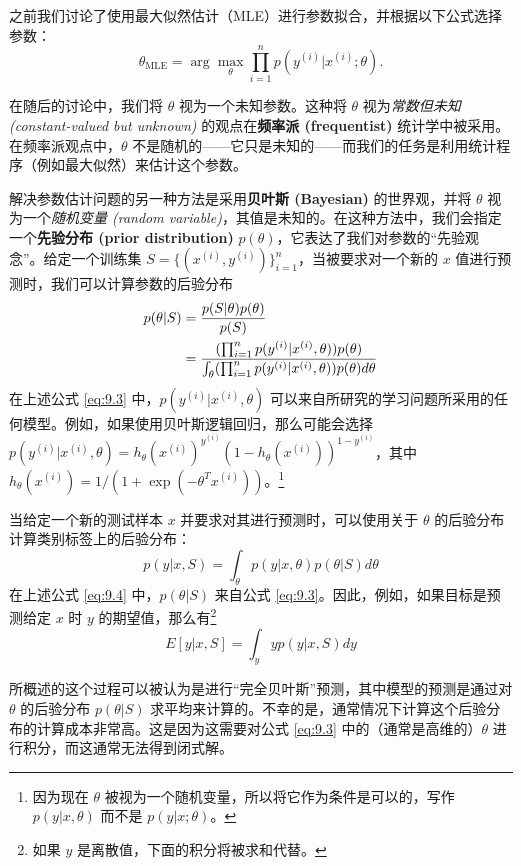 之前我们讨论了使用最大似然估计（MLE）进行参数拟合，并根据以下公式选择参数：
\[
    \theta_{\text{MLE}} = \arg \max_\theta \prod_{i=1}^n p(y^{(i)} | x^{(i)}; \theta).
\]

在随后的讨论中，我们将 $\theta$ 视为一个未知参数。这种将 $\theta$ 视为\textit{常数但未知 (constant-valued but unknown)} 的观点在\textbf{频率派 (frequentist)} 统计学中被采用。在频率派观点中，$\theta$ 不是随机的——它只是未知的——而我们的任务是利用统计程序（例如最大似然）来估计这个参数。

解决参数估计问题的另一种方法是采用\textbf{贝叶斯 (Bayesian)} 的世界观，并将 $\theta$ 视为一个\textit{随机变量 (random
variable)}，其值是未知的。在这种方法中，我们会指定一个\textbf{先验分布 (prior distribution)} $p(\theta)$，它表达了我们对参数的“先验观念”。给定一个训练集 $S = \{(x^{(i)}, y^{(i)})\}_{i=1}^n$，当被要求对一个新的 $x$ 值进行预测时，我们可以计算参数的后验分布
\begin{align}
    p(\theta | S) &= \frac{p(S | \theta) p(\theta)}{p(S)} \notag \\
    &= \frac{(\prod_{i=1}^n p(y^{(i)} | x^{(i)}, \theta)) p(\theta)}{\int_\theta (\prod_{i=1}^n p(y^{(i)} | x^{(i)}, \theta)) p(\theta) d\theta} \label{eq:9.3}
\end{align}
在上述公式 \eqref{eq:9.3} 中，$p(y^{(i)} | x^{(i)}, \theta)$ 可以来自所研究的学习问题所采用的任何模型。例如，如果使用贝叶斯逻辑回归，那么可能会选择 $p(y^{(i)}|x^{(i)}, \theta) = h_\theta(x^{(i)})^{y^{(i)}} (1-h_\theta(x^{(i)}))^{1-y^{(i)}}$，其中 $h_\theta(x^{(i)}) = 1/(1 + \exp(-\theta^T x^{(i)}))$。\footnote{因为现在 $\theta$ 被视为一个随机变量，所以将它作为条件是可以的，写作 $p(y|x, \theta)$ 而不是 $p(y|x; \theta)$。}

当给定一个新的测试样本 $x$ 并要求对其进行预测时，可以使用关于 $\theta$ 的后验分布计算类别标签上的后验分布：
\begin{equation}
    p(y|x, S) = \int_\theta p(y|x, \theta) p(\theta|S) d\theta
    \label{eq:9.4}
\end{equation}
在上述公式 \eqref{eq:9.4} 中，$p(\theta|S)$ 来自公式 \eqref{eq:9.3}。因此，例如，如果目标是预测给定 $x$ 时 $y$ 的期望值，那么有\footnote{如果 $y$ 是离散值，下面的积分将被求和代替。}
\[    
    E[y|x, S] = \int_y y p(y|x, S) dy
\]

所概述的这个过程可以被认为是进行“完全贝叶斯”预测，其中模型的预测是通过对 $\theta$ 的后验分布 $p(\theta|S)$ 求平均来计算的。不幸的是，通常情况下计算这个后验分布的计算成本非常高。这是因为这需要对公式 \eqref{eq:9.3} 中的（通常是高维的）$\theta$ 进行积分，而这通常无法得到闭式解。

